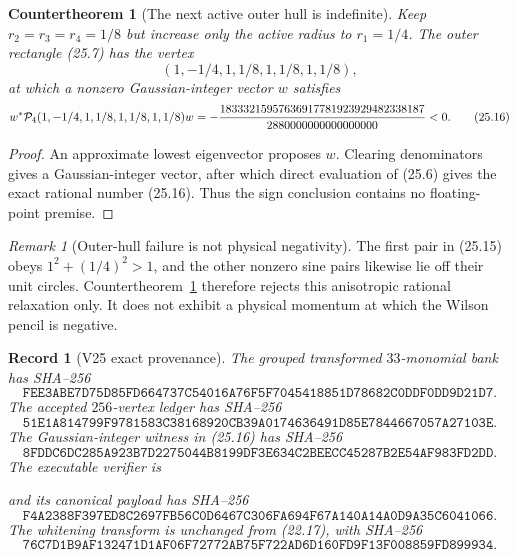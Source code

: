 \documentclass[11pt,oneside]{article}
\newtheorem{record}[theorem]{Record}
\newtheorem{countertheorem}[theorem]{Countertheorem}
\theoremstyle{definition}
\theoremstyle{remark}
\newtheorem{remark}[theorem]{Remark}
\begin{document}
\begin{countertheorem}[The next active outer hull is indefinite]
\label{ctr:newv25-active-quarter}
Keep \(r_2=r_3=r_4=1/8\) but increase only the active radius to
\(r_1=1/4\).  The outer rectangle (25.7) has the vertex
\[
 (1,-1/4,1,1/8,1,1/8,1,1/8),                           \tag{25.15}
\]
at which a nonzero Gaussian-integer vector \(w\) satisfies
\[
 w^*{\cal P}_4(1,-1/4,1,1/8,1,1/8,1,1/8)w
 =
 -\frac{18333215957636917781923929482338187}
 {2880000000000000000}<0.                               \tag{25.16}
\]
\end{countertheorem}

\begin{proof}
An approximate lowest eigenvector proposes \(w\).  Clearing
denominators gives a Gaussian-integer vector, after which direct
evaluation of (25.6) gives the exact rational number (25.16).
Thus the sign conclusion contains no floating-point premise.
\end{proof}

\begin{remark}[Outer-hull failure is not physical negativity]
\label{rem:newv25-relaxation}
The first pair in (25.15) obeys
\(1^2+(1/4)^2>1\), and the other nonzero sine pairs likewise lie off
their unit circles.  Countertheorem~\ref{ctr:newv25-active-quarter}
therefore rejects this anisotropic rational relaxation only.  It
does not exhibit a physical momentum at which the Wilson pencil is
negative.
\end{remark}

\begin{record}[V25 exact provenance]
\label{rec:newv25-provenance}
The grouped transformed \(33\)-monomial bank has SHA--256
\[
\texttt{FEE3ABE7D75D85FD664737C54016A76F5F7045418851D78682C0DDF0DD9D21D7}.
                                                               \tag{25.17}
\]
The accepted \(256\)-vertex ledger has SHA--256
\[
\texttt{51E1A814799F9781583C38168920CB39A0174636491D85E7844667057A27103E}.
                                                               \tag{25.18}
\]
The Gaussian-integer witness in (25.16) has SHA--256
\[
\texttt{8FDDC6DC285A923B7D2275044B8199DF3E634C2BEECC45287B2E54AF983FD2DD}.
                                                               \tag{25.19}
\]
The executable verifier is
\begin{center}
\footnotesize
{}
\end{center}
and its canonical payload has SHA--256
\[
\texttt{F4A2388F397ED8C2697FB56C0D6467C306FA694F67A140A14A0D9A35C6041066}.
                                                               \tag{25.20}
\]
The whitening transform is unchanged from (22.17), with SHA--256
\[
\texttt{76C7D1B9AF132471D1AF06F72772AB75F722AD6D160FD9F13F008859FD899934}.
                                                               \tag{25.21}
\]
\end{record}
\end{document}
